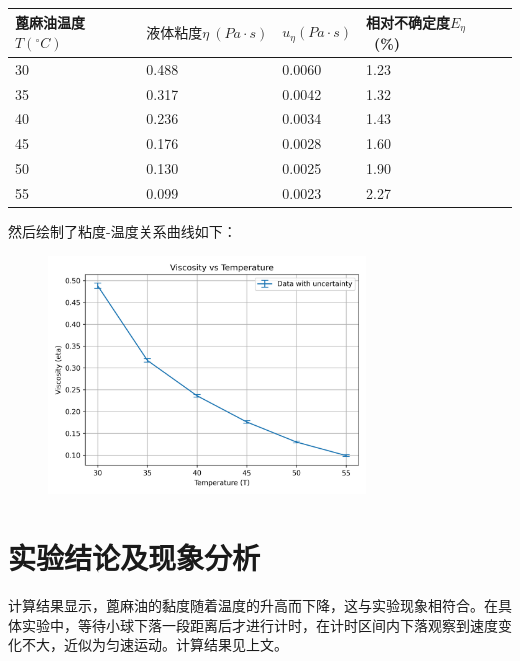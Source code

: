 \documentclass{ctexart}
\begin{document}
\begin{table}[h]
    \renewcommand\arraystretch{1.3}
    \centering
    \begin{tabular}{|m{2.8cm}<{\centering}|m{2.5cm}<{\centering}|m{2.5cm}<{\centering}|m{2.5cm}<{\centering}|}
        \hline
        蓖麻油温度$T(^\circ C)$ & $液体粘度\eta \  (Pa\cdot s)$ & $u_\eta (Pa\cdot s)$ & 相对不确定度$E_\eta$ \ (\%) \\  
        \hline
        30 &0.488 & 0.0060 & 1.23\\
        \hline
        35 &0.317 & 0.0042 & 1.32\\
        \hline
        40 &0.236 & 0.0034 & 1.43\\
        \hline
        45 &0.176 & 0.0028 & 1.60\\
        \hline
        50 &0.130 & 0.0025 & 1.90\\
        \hline
        55 &0.099 & 0.0023 & 2.27\\
        \hline
    \end{tabular}
\end{table}

然后绘制了粘度-温度关系曲线如下：

\begin{figure}[h]
    \centering
    \includegraphics[width=0.75\textwidth]{vscsty_vs_tmprtr.png}
\end{figure}

\section{实验结论及现象分析}

计算结果显示，蓖麻油的黏度随着温度的升高而下降，这与实验现象相符合。在具体实验中，等待小球下落一段距离后才进行计时，在计时区间内下落观察到速度变化不大，近似为匀速运动。计算结果见上文。
\end{document}
